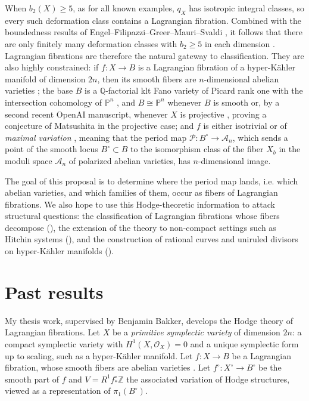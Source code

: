 \documentclass[11pt]{article}
\newcommand{\Q}{\mathbb{Q}}
\newcommand{\Z}{\mathbb{Z}}
\newcommand{\bbP}{\mathbb{P}}
\newcommand{\cA}{\mathcal{A}}
\newcommand{\cO}{\mathcal{O}}
\newcommand{\cP}{\mathcal{P}}
\theoremstyle{compact}
\begin{document}
When $b_2(X)\ge5$, as for all known examples, $q_X$ has isotropic integral classes, so every
such deformation class contains a Lagrangian fibration. Combined with the boundedness results
of Engel--Filipazzi--Greer--Mauri--Svaldi \cite{engel25}, it follows that there are only
finitely many deformation classes with $b_2\ge5$ in each dimension
\cite{openai-syz26,engel-mauri26}. Lagrangian fibrations are therefore the natural gateway to
classification. They are also highly constrained:
if $f: X\to B$ is a Lagrangian fibration of a hyper-K\"ahler manifold of dimension
$2n$, then its smooth fibers are $n$-dimensional abelian varieties \cite{matsushita99};
the base $B$ is a $\Q$-factorial klt Fano variety of Picard rank one with the intersection
cohomology of $\bbP^n$ \cite{matsushita99,shen-yin22}, and $B\cong\bbP^n$ whenever $B$ is
smooth \cite{hwang08,greb-lehn14,bakker-schnell23} or, by a second recent OpenAI manuscript,
whenever $X$ is projective \cite{openai-bases26}, proving a conjecture of Matsushita in the
projective case; and $f$ is either isotrivial or of \emph{maximal variation}
\cite{bakker25}, meaning that the period map $\cP\colon B^\circ\to\cA_n$, which sends a
point of the smooth locus $B^\circ\subset B$ to the isomorphism class of the fiber $X_b$ in
the moduli space $\cA_n$ of polarized abelian varieties, has $n$-dimensional image.

The goal of this proposal is to determine where the period map lands, i.e. which
abelian varieties, and which families of them, occur as fibers of Lagrangian
fibrations. We also hope to use this Hodge-theoretic information to attack structural questions:
the classification of Lagrangian fibrations whose fibers decompose
(), the extension of the theory to non-compact settings such as
Hitchin systems (), and the construction of rational curves and
uniruled divisors on hyper-K\"ahler manifolds ().

\section{Past results}

My thesis work, supervised by Benjamin Bakker, develops the Hodge theory of Lagrangian
fibrations. Let $X$ be a \emph{primitive symplectic variety} of dimension $2n$: a compact
symplectic variety with $H^1(X,\cO_X)=0$ and a unique symplectic form up to scaling, such as
a hyper-K\"ahler manifold. Let $f: X\to B$ be a Lagrangian fibration, whose smooth
fibers are abelian varieties \cite{schwald20}. Let $f^\circ: X^\circ\to B^\circ$ be the
smooth part of $f$ and $V=R^1f^\circ_*\Z$ the associated variation of Hodge structures,
viewed as a representation of $\pi_1(B^\circ)$.
\end{document}
